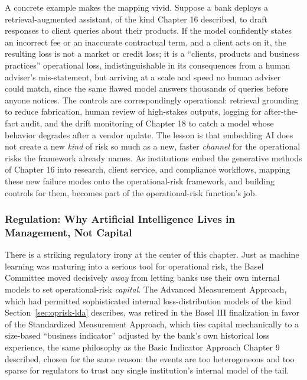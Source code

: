 \documentclass[../ai_in_finance]{subfiles}
\begin{document}
A concrete example makes the mapping vivid. Suppose a bank deploys a retrieval-augmented assistant, of the kind Chapter 16 described, to draft responses to client queries about their products. If the model confidently states an incorrect fee or an inaccurate contractual term, and a client acts on it, the resulting loss is not a market or credit loss; it is a ``clients, products and business practices'' operational loss, indistinguishable in its consequences from a human adviser's mis-statement, but arriving at a scale and speed no human adviser could match, since the same flawed model answers thousands of queries before anyone notices. The controls are correspondingly operational: retrieval grounding to reduce fabrication, human review of high-stakes outputs, logging for after-the-fact audit, and the drift monitoring of Chapter 18 to catch a model whose behavior degrades after a vendor update. The lesson is that embedding AI does not create a new \emph{kind} of risk so much as a new, faster \emph{channel} for the operational risks the framework already names. As institutions embed the generative methods of Chapter 16 into research, client service, and compliance workflows, mapping these new failure modes onto the operational-risk framework, and building controls for them, becomes part of the operational-risk function's job.

\subsubsection*{Regulation: Why Artificial Intelligence Lives in Management, Not Capital}
\label{sec:oprisk-regulation}

There is a striking regulatory irony at the center of this chapter. Just as machine learning was maturing into a serious tool for operational risk, the Basel Committee moved decisively \emph{away} from letting banks use their own internal models to set operational-risk \emph{capital}. The Advanced Measurement Approach, which had permitted sophisticated internal loss-distribution models of the kind Section~\ref{sec:oprisk-lda} describes, was retired in the Basel III finalization in favor of the Standardized Measurement Approach, which ties capital mechanically to a size-based ``business indicator'' adjusted by the bank's own historical loss experience, the same philosophy as the Basic Indicator Approach Chapter 9 described, chosen for the same reason: the events are too heterogeneous and too sparse for regulators to trust any single institution's internal model of the tail.
\end{document}
